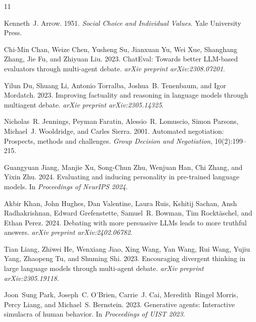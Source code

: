 \documentclass[11pt]{article}
\begin{document}
\begin{thebibliography}{11}

Kenneth~J. Arrow. 1951.
\emph{Social Choice and Individual Values}.
Yale University Press.

Chi-Min Chan, Weize Chen, Yusheng Su, Jianxuan Yu, Wei Xue, Shanghang Zhang, Jie Fu, and Zhiyuan Liu. 2023.
{ChatEval}: Towards better {LLM}-based evaluators through multi-agent debate.
\emph{arXiv preprint arXiv:2308.07201}.

Yilun Du, Shuang Li, Antonio Torralba, Joshua~B. Tenenbaum, and Igor Mordatch. 2023.
Improving factuality and reasoning in language models through multiagent debate.
\emph{arXiv preprint arXiv:2305.14325}.

Nicholas~R. Jennings, Peyman Faratin, Alessio~R. Lomuscio, Simon Parsons, Michael~J. Wooldridge, and Carles Sierra. 2001.
Automated negotiation: Prospects, methods and challenges.
\emph{Group Decision and Negotiation}, 10(2):199--215.

Guangyuan Jiang, Manjie Xu, Song-Chun Zhu, Wenjuan Han, Chi Zhang, and Yixin Zhu. 2024.
Evaluating and inducing personality in pre-trained language models.
In \emph{Proceedings of NeurIPS 2024}.

Akbir Khan, John Hughes, Dan Valentine, Laura Ruis, Kshitij Sachan, Ansh Radhakrishnan, Edward Grefenstette, Samuel~R. Bowman, Tim Rockt\"{a}schel, and Ethan Perez. 2024.
Debating with more persuasive {LLMs} leads to more truthful answers.
\emph{arXiv preprint arXiv:2402.06782}.

Tian Liang, Zhiwei He, Wenxiang Jiao, Xing Wang, Yan Wang, Rui Wang, Yujiu Yang, Zhaopeng Tu, and Shuming Shi. 2023.
Encouraging divergent thinking in large language models through multi-agent debate.
\emph{arXiv preprint arXiv:2305.19118}.

Joon~Sung Park, Joseph~C. O'Brien, Carrie~J. Cai, Meredith~Ringel Morris, Percy Liang, and Michael~S. Bernstein. 2023.
Generative agents: Interactive simulacra of human behavior.
In \emph{Proceedings of UIST 2023}.


\end{thebibliography}
\end{document}
